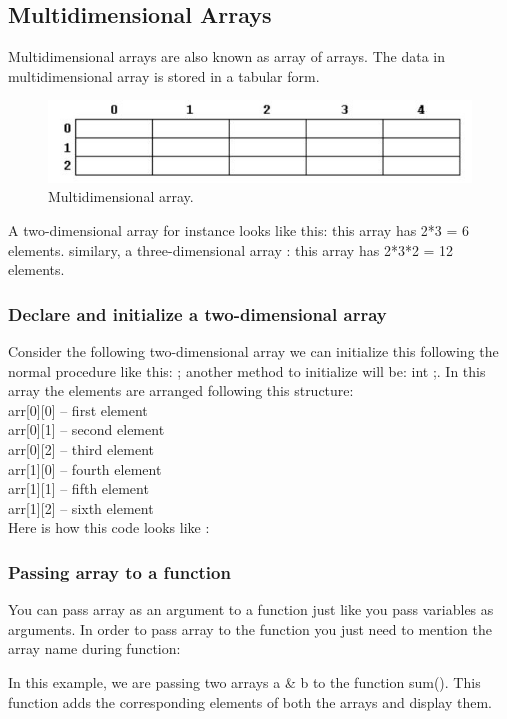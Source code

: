 \documentclass[11pt, a4paper]{article}
\begin{document}
\subsection{Multidimensional Arrays}
Multidimensional arrays are also known as array of arrays. The data in multidimensional array
is stored in a tabular form.

\begin{figure}[h!]
    \includegraphics[width = \linewidth]{diagrams/multiDimArr.JPG}
    \caption{Multidimensional array.}
    \label{fig:Multidimensional array.}
\end{figure}
A two-dimensional array for instance looks like this:
 this array has 2*3 = 6 elements. similary, a three-dimensional array :
 this array has 2*3*2 = 12 elements.

\subsubsection{Declare and initialize a two-dimensional array}
Consider the following two-dimensional array  we can initialize this following
the normal procedure like this: ; another method to initialize
will be: int ;. In this array the elements are arranged
following this structure: \\
arr[0][0] – first element\\
arr[0][1] – second element\\
arr[0][2] – third element\\
arr[1][0] – fourth element\\
arr[1][1] – fifth element\\
arr[1][2] – sixth element\\
Here is how this code looks like :


\subsubsection{Passing array to a function}
You can pass array as an argument to a function just like you pass variables as arguments.
In order to pass array to the function you just need to mention the array name during
function: 

In this example, we are passing two arrays a \& b to the function sum().
This function adds the corresponding elements of both the arrays and display them.
\end{document}
